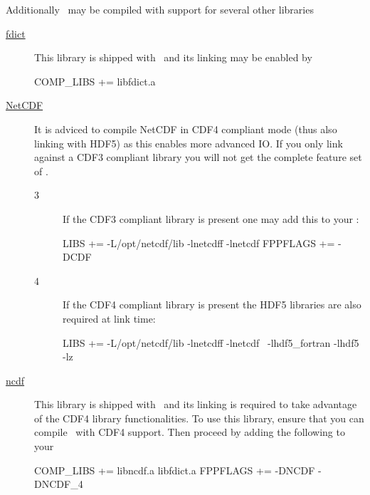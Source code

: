Additionally \siesta\ may be compiled with support for several other
libraries
\begin{description}

  \item[\href{https://github.com/zerothi/fdict}{fdict}] %
  This library is shipped with \siesta\ and its linking may be enabled
  by 
  \begin{shellexample}
    COMP_LIBS += libfdict.a
  \end{shellexample}


  \item[\href{https://www.unidata.ucar.edu/software/netcdf}{NetCDF}] %
  It is adviced to compile NetCDF in CDF4 compliant mode (thus
  also linking with HDF5) as this enables more advanced IO. If you
  only link against a CDF3 compliant library you will not get the
  complete feature set of \siesta.

  \begin{description}
    \item[3]%
    If the CDF3 compliant library is present one may add this to
    your :
\begin{shellexample}
  LIBS += -L/opt/netcdf/lib -lnetcdff -lnetcdf
  FPPFLAGS += -DCDF
\end{shellexample}

    \item[4]%
    If the CDF4 compliant library is present the HDF5 libraries
    are also required at link time:
\begin{shellexample}
  LIBS += -L/opt/netcdf/lib -lnetcdff -lnetcdf \
            -lhdf5_fortran -lhdf5 -lz
\end{shellexample}

  \end{description}

  
  \item[\href{https://github.com/zerothi/ncdf}{ncdf}] %
  This library is shipped with \siesta\ and its linking is required to
  take advantage of the CDF4 library functionalities. To use this
  library, ensure that you can compile \siesta\ with CDF4
  support. Then proceed by adding the following to your 
  \begin{shellexample}
    COMP_LIBS += libncdf.a libfdict.a
    FPPFLAGS += -DNCDF -DNCDF_4
  \end{shellexample}


\end{description}
